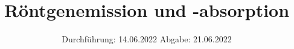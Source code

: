 

\subject{V 602}
\title{Röntgenemission und -absorption}
\date{%
  Durchführung: 14.06.2022
  \hspace{3em}
  Abgabe: 21.06.2022
}



\maketitle
\thispagestyle{empty}
\tableofcontents
\newpage








